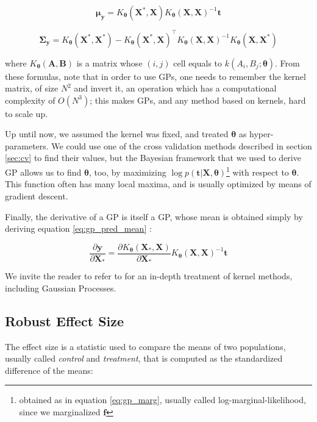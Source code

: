 \documentclass[a4paper]{book}
\begin{document}
\begin{equation}
\label{eq:gp_pred_mean}
\bm\mu_{\bm y}=K_{\bm\theta}(\bm X^*,\bm X) K_{\bm\theta}(\bm X,\bm X)^{-1}\bm t
\end{equation}

\begin{equation}
\bm\Sigma_{\bm y}=K_{\bm\theta}(\bm X^*,\bm X^*)-K_{\bm\theta}(\bm X^*,\bm X)^\intercal K_{\bm\theta}(\bm X, \bm X)^{-1}K_{\bm\theta}(\bm X,\bm X^*)
\end{equation}

\noindent where $K_{\bm\theta}(\bm A,\bm B)$ is a matrix whose $(i,j)$ cell equals to $k(A_i,B_j;\bm\theta)$. From these formulas, note that in order to use GPs, one needs to remember the kernel matrix, of size $N^2$ and invert it, an operation which has a computational complexity of $O(N^3)$; this makes GPs, and any method based on kernels, hard to scale up.

Up until now, we assumed the kernel was fixed, and treated $\bm\theta$ as hyper-parameters. We could use one of the cross validation methods described in section \ref{sec:cv} to find their values, but the Bayesian framework that we used to derive GP allows us to find $\bm\theta$, too, by maximizing $\log p(\bm t\vert\bm X,\bm\theta)$\footnote{obtained as in equation \ref{eq:gp_marg}, usually called log-marginal-likelihood, since we marginalized $\bm f$} with respect to $\bm\theta$. This function often has many local maxima, and is usually optimized by means of gradient descent.

Finally, the derivative of a GP is itself a GP, whose mean is obtained simply by deriving equation \ref{eq:gp_pred_mean} \citep{gp_diff}:

\begin{equation}
\label{eq:gp_gradient}
\frac{\partial\bm y}{\partial\bm X_*}=\frac{\partial K_{\bm\theta}(\bm X_*,\bm X)}{\partial\bm X_*}K_{\bm\theta}(\bm X,\bm X)^{-1}\bm t
\end{equation}

We invite the reader to refer to \cite[Chapter~6]{bishop} for an in-depth treatment of kernel methods, including Gaussian Processes.


\subsection{Robust Effect Size}
\label{sec:effect_size}
The effect size is a statistic used to compare the means of two populations, usually called \emph{control} and \emph{treatment}, that is computed as the standardized difference of the means:
\end{document}
